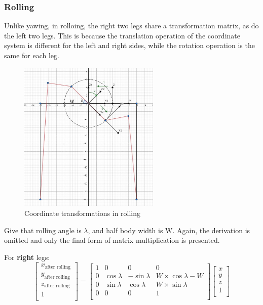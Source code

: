 \subsubsection{Rolling}

Unlike yawing, in rolloing, the right two legs share a transformation matrix, as do the left two legs. This is because the translation operation of the coordinate system is different for the left and right sides, while the rotation operation is the same for each leg.

\begin{figure}[htbp]
   \centering
   \includegraphics[width=0.6\textwidth]{figures/coordinate_transformations_in_rolling.jpg}
   \caption{Coordinate transformations in rolling}
   \label{fig:coordinate_transformations_in_rolling}
\end{figure}

Give that rolling angle is $\lambda$, and half body width is W. Again, the derivation is omitted and only the final form of matrix multiplication is presented.

For \textbf{right} legs:
\begin{equation}
   \begin{bmatrix}
   x_\text{after rolling} \\
   y_\text{after rolling} \\
   z_\text{after rolling} \\
   1                      \\
   \end{bmatrix}
   =
   \begin{bmatrix}
   1 & 0 & 0 & 0 \\
   0 & \cos\lambda & -\sin\lambda & W \times \cos\lambda - W \\
   0 & \sin\lambda & \cos\lambda & W \times \sin\lambda \\
   0 & 0 & 0 & 1 \\
   \end{bmatrix}
   \begin{bmatrix}
   x \\
   y \\
   z \\
   1 \\
   \end{bmatrix}
\end{equation}

